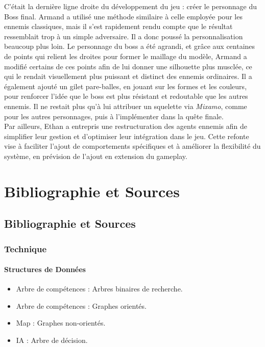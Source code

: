 \documentclass{report}
\begin{document}
C’était la dernière ligne droite du développement du jeu : créer le personnage du Boss final. Armand a utilisé une méthode similaire à celle employée pour les ennemis classiques, mais il s’est rapidement rendu compte que le résultat ressemblait trop à un simple adversaire. Il a donc poussé la personnalisation beaucoup plus loin. Le personnage du boss a été agrandi, et grâce aux centaines de points qui relient les droites pour former le maillage du modèle, Armand a modifié certains de ces points afin de lui donner une silhouette plus musclée, ce qui le rendait visuellement plus puissant et distinct des ennemis ordinaires. Il a également ajouté un gilet pare-balles, en jouant sur les formes et les couleurs, pour renforcer l’idée que le boss est plus résistant et redoutable que les autres ennemis.
Il ne restait plus qu’à lui attribuer un squelette via \textit{Mixamo}, comme pour les autres personnages, puis à l’implémenter dans la quête finale.
\\[0.4cm]
Par ailleurs, Ethan a entrepris une restructuration des agents ennemis afin de simplifier leur gestion et d’optimiser leur intégration dans le jeu. Cette refonte vise à faciliter l’ajout de comportements spécifiques et à améliorer la flexibilité du système, en prévision de l’ajout en extension du gameplay.









\newpage
\part{Bibliographie et Sources}
\chapter{Bibliographie et Sources}
\section{Technique}

\subsection{Structures de Données}
\begin{itemize}
    \item Arbre de compétences : Arbres binaires de recherche.
    \item Arbre de compétences : Graphes orientés.
    \item Map : Graphes non-orientés.
    \item IA : Arbre de décision.
\end{itemize}
\end{document}
